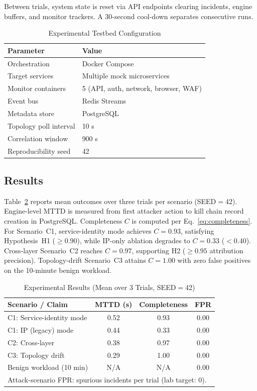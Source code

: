 \documentclass[conference]{IEEEtran}
\begin{document}
Between trials, system state is reset via API endpoints clearing incidents,
engine buffers, and monitor trackers. A 30-second cool-down separates
consecutive runs.

\begin{table}[!t]
\caption{Experimental Testbed Configuration}
\label{tab:testbed}
\centering
\small
\begin{tabular}{ll}
\toprule
\textbf{Parameter} & \textbf{Value} \\
\midrule
Orchestration       & Docker Compose \\
Target services     & Multiple mock microservices \\
Monitor containers  & 5 (API, auth, network, browser, WAF) \\
Event bus           & Redis Streams \\
Metadata store      & PostgreSQL \\
Topology poll interval & 10 s \\
Correlation window  & 900 s \\
Reproducibility seed & 42 \\
\bottomrule
\end{tabular}
\end{table}

\subsection{Results}
Table~\ref{tab:results} reports mean outcomes over three trials per
scenario (SEED$=$42). Engine-level MTTD is measured from first attacker
action to kill chain record creation in PostgreSQL. Completeness $C$ is
computed per Eq.~\eqref{eq:completeness}. For Scenario~C1, service-identity
mode achieves $C=0.93$, satisfying Hypothesis~H1 ($\geq 0.90$), while
IP-only ablation degrades to $C=0.33$ ($< 0.40$). Cross-layer Scenario~C2
reaches $C=0.97$, supporting H2 ($\geq 0.95$ attribution precision).
Topology-drift Scenario~C3 attains $C=1.00$ with zero false positives on
the 10-minute benign workload.

\begin{table}[!t]
\caption{Experimental Results (Mean over 3 Trials, SEED$=$42)}
\label{tab:results}
\centering
\small
\begin{tabular}{lccc}
\toprule
\textbf{Scenario / Claim} & \textbf{MTTD (s)} & \textbf{Completeness} & \textbf{FPR} \\
\midrule
C1: Service-identity mode   & 0.52 & 0.93 & 0.00 \\
C1: IP (legacy) mode        & 0.44 & 0.33 & 0.00 \\
C2: Cross-layer           & 0.38 & 0.97 & 0.00 \\
C3: Topology drift        & 0.29 & 1.00 & 0.00 \\
Benign workload (10 min)  & N/A & N/A & 0.00 \\
\bottomrule
\multicolumn{4}{l}{\footnotesize Attack-scenario FPR: spurious incidents per trial (lab target: 0).}
\end{tabular}
\end{table}
\end{document}
